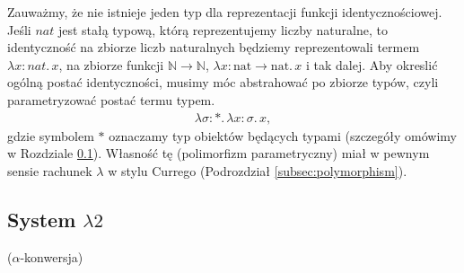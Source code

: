 \begin{przyklad}
  Zauważmy, że nie istnieje jeden typ dla reprezentacji funkcji identycznościowej. Jeśli \(nat\) jest stałą typową, którą reprezentujemy liczby naturalne, to identyczność na zbiorze liczb naturalnych będziemy reprezentowali termem \(\lambda x:nat.\,x\), na zbiorze funkcji \(\mathbb{N}\to\mathbb{N}\), \(\lambda x:\mathrm{nat}\to\mathrm{nat}.\,x\) i tak dalej.
  Aby okreslić ogólną postać identyczności, musimy móc abstrahować po zbiorze typów, czyli parametryzować postać termu typem. %
      \begin{align*}
        \lambda \sigma:* .\,\lambda x:\sigma.\,x,
      \end{align*}
      gdzie symbolem \(*\) oznaczamy typ obiektów będących typami (szczegóły omówimy w Rozdziale \ref{subsec:lambda2}).
      Własność tę (polimorfizm parametryczny) miał w pewnym sensie rachunek \(\lambda\) w stylu Currego (Podrozdział \ref{subsec:polymorphism}). 
\end{przyklad}
\subsection{System \(\lambda 2\)}\label{subsec:lambda2}

  \begin{definicja}(\(\alpha\)-konwersja)
  \end{definicja}

